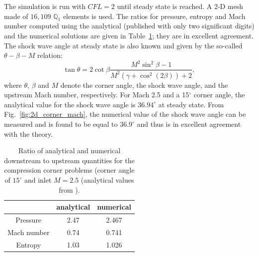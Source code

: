 \documentclass[preprint,10pt]{elsarticle}
\newcommand{\fig}[1]{Fig.~\ref{#1}}                      %
\newcommand{\tbl}[1]{Table~\ref{#1}}                     %
\begin{document}
The simulation is run with $CFL=2$ until steady state is reached. A 2-D mesh made of $16,109$ $\mathbb{Q}_1$ elements 
is used. The ratios for pressure, entropy and Mach number computed using the analytical (published with only two 
significant digits) and the numerical solutions are given in \tbl{tbl:corner_exact_sol}; they are in excellent 
agreement. The shock wave angle at steady state is also known and given by the so-called $\theta -\beta -M$ relation:
%
\begin{equation}
\tan \theta = 2 \cot \beta \frac{M^2 \sin^2 \beta -1}{M^2 \left(\gamma+\cos^2 (2\beta)\right)+2} ,
\end{equation}
%
where $\theta$, $\beta$ and $M$ denote the corner angle, the shock wave angle, and the upstream Mach number, respectively. 
For Mach 2.5 and a 15$^\circ$ corner angle, the analytical value for the shock wave angle is $36.94^\circ$ 
at steady state. From \fig{fig:2d_corner_mach}, the numerical value of the shock wave angle can be measured 
and is found to be equal to $36.9^{\circ}$ and thus is in excellent agreement with the theory.
%
\begin{table}[H]
\begin{center}
\begin{tabular}{|c|c|c|}  \hline
            & analytical & numerical\\ \hline
Pressure    & 2.47       & 2.467    \\ \hline
Mach number &  0.74      & 0.741    \\ \hline
Entropy     & 1.03       & 1.026    \\ \hline 
\end{tabular}
\caption{\label{tbl:corner_exact_sol} Ratio of analytical and numerical downstream to upstream quantities for 
the compression corner problems (corner angle of $15^\circ$ and inlet $M=2.5$ (analytical values from \cite{CompressionCorner}).}
\end{center}
\end{table}
%
\end{document}
